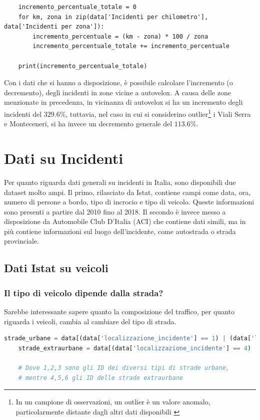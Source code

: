 \documentclass[a4paper]{report}
\begin{document}
\begin{lstlisting}
    incremento_percentuale_totale = 0
    for km, zona in zip(data['Incidenti per chilometro'], data['Incidenti per zona']): 
        incremento_percentuale = (km - zona) * 100 / zona
        incremento_percentuale_totale += incremento_percentuale

    print(incremento_percentuale_totale)
\end{lstlisting}

Con i dati che si hanno a disposizione, è possibile calcolare l'incremento (o decremento), degli 
incidenti in zone vicine a autovelox.
A causa delle zone menzionate in precedenza, in vicinanza di autovelox si ha un incremento degli 
incidenti del $329.6$\%, tuttavia, nel caso in cui si considerino 
outlier\footnote{In un campione di osservazioni, un outlier è un valore anomalo, 
particolarmente distante dagli altri dati disponibili \cite{PROB_E_STATISTICA:1}} 
i Viali Serra e Monteceneri, si ha invece un decremento generale del $113.6$\%.


\chapter{Dati su Incidenti}

Per quanto riguarda dati generali su incidenti in Italia, sono disponibili due dataset molto ampi. 
Il primo, rilasciato da Istat, contiene campi come data, ora, 
numero di persone a bordo, tipo di incrocio e tipo di veicolo.
Queste informazioni sono presenti a partire dal 2010 fino al 2018.
Il secondo è invece messo a disposizione da Automobile Club D'Italia (ACI) che contiene dati simili, 
ma in più contiene informazioni sul luogo dell'incidente, come autostrada o strada provinciale.

\section{Dati Istat su veicoli}

\subsection{Il tipo di veicolo dipende dalla strada?}

Sarebbe interessante sapere quanto la composizione del traffico, per quanto riguarda i veicoli, 
cambia al cambiare del tipo di strada.

\begin{lstlisting}[language=Python]
    strade_urbane = data[(data['localizzazione_incidente'] == 1) | (data['localizzazione_incidente'] == 2) | (data['localizzazione_incidente'] == 3)]['tipo_veicolo_a']
    strade_extraurbane = data[(data['localizzazione_incidente'] == 4) | (data['localizzazione_incidente'] == 5) | (data['localizzazione_incidente'] == 6)]['tipo_veicolo_a']

    # Dove 1,2,3 sono gli ID dei diversi tipi di strade urbane, 
    # mentre 4,5,6 gli ID delle strade extraurbane
\end{lstlisting}
\end{document}
